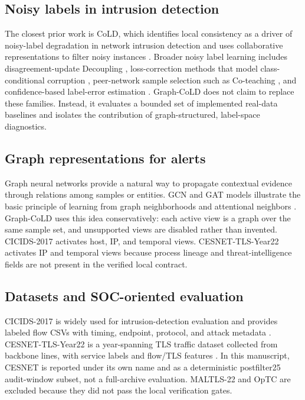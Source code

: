 \documentclass[preprint,review,12pt]{elsarticle}
\begin{document}
\subsection{Noisy labels in intrusion detection}
The closest prior work is CoLD, which identifies local consistency as a driver
of noisy-label degradation in network intrusion detection and uses collaborative
representations to filter noisy instances \cite{yang2026cold}. Broader noisy
label learning includes disagreement-update Decoupling \cite{malach2017decoupling}, loss-correction methods that model class-conditional
corruption \cite{patrini2017loss}, peer-network sample selection such as
Co-teaching \cite{han2018coteaching}, and confidence-based label-error
estimation \cite{northcutt2021confident}. Graph-CoLD does not claim to replace
these families. Instead, it evaluates a bounded set of implemented real-data
baselines and isolates the contribution of graph-structured, label-space
diagnostics.

\subsection{Graph representations for alerts}
Graph neural networks provide a natural way to propagate contextual evidence
through relations among samples or entities. GCN and GAT models illustrate the
basic principle of learning from graph neighborhoods and attentional neighbors
\cite{kipf2017gcn,velickovic2018gat}. Graph-CoLD uses this idea conservatively:
each active view is a graph over the same sample set, and unsupported views are
disabled rather than invented. CICIDS-2017 activates host, IP, and temporal
views. CESNET-TLS-Year22 activates IP and temporal views because process lineage
and threat-intelligence fields are not present in the verified local contract.

\subsection{Datasets and SOC-oriented evaluation}
CICIDS-2017 is widely used for intrusion-detection evaluation and provides
labeled flow CSVs with timing, endpoint, protocol, and attack metadata
\cite{sharafaldin2018cicids}. CESNET-TLS-Year22 is a year-spanning TLS traffic
dataset collected from backbone lines, with service labels and flow/TLS features
\cite{hynek2024cesnettlsyear22,cesnettlsyear22}. In this manuscript, CESNET is
reported under its own name and as a deterministic postfilter25 audit-window
subset, not a full-archive evaluation. MALTLS-22 and OpTC are excluded because
they did not pass the local verification gates.
\end{document}
